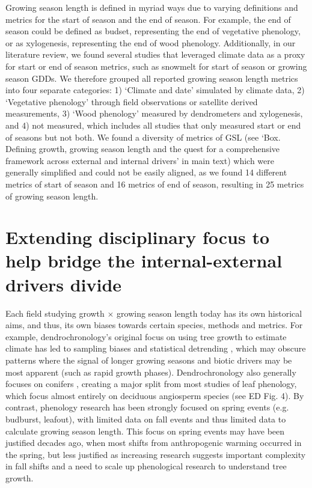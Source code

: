 \documentclass[11pt]{article}
\begin{document}
Growing season length is defined in myriad ways due to varying definitions and metrics for the start of season and the end of season. For example, the end of season could be defined as budset, representing the end of vegetative phenology, or as xylogenesis, representing the end of wood phenology. Additionally, in our literature review, we found several studies that leveraged climate data as a proxy for start or end of season metrics, such as snowmelt for start of season or growing season GDDs. We therefore grouped all reported growing season length metrics into four separate categories: 1) `Climate and date' simulated by climate data, 2) `Vegetative phenology' through field observations or satellite derived measurements, 3) `Wood phenology' measured by dendrometers and xylogenesis, and 4) not measured, which includes all studies that only measured start or end of seasons but not both. We found a diversity of metrics of GSL (see `Box. Defining growth, growing season length and the quest for a comprehensive framework across external and internal drivers' in main text) which were generally simplified and could not be easily aligned, as we found 14 different metrics of start of season and 16 metrics of end of season, resulting in  25 metrics of growing season length. 

\section*{Extending disciplinary focus to help bridge the internal-external drivers divide} 

Each field studying growth $\times$ growing season length today has its own historical aims, and thus, its own biases towards certain species, methods and metrics. For example, dendrochronology's original focus on using tree growth to estimate climate has led to sampling biases \citep[e.g. to `climate-sensitive' individual trees,][]{klesse2018sampling,nehrbass2014influence} and statistical detrending \citep{rollinson2021climate}, which may obscure patterns where the signal of longer growing seasons and biotic drivers may be most apparent (such as rapid growth phases). Dendrochronology also generally focuses on conifers \citep[gymnosperms,][]{zhao2019international}, creating a major split from most studies of leaf phenology, which focus almost entirely on deciduous angiosperm species (see ED Fig. 4). By contrast, phenology research has been strongly focused on spring events (e.g. budburst, leafout), with limited data on fall events and thus limited data to calculate growing season length. This focus on spring events may have been justified decades ago, when most shifts from anthropogenic warming occurred in the spring, but less justified as increasing research suggests important complexity in fall shifts \citep{gill2015,zohner2023effect} and a need to scale up phenological research to understand tree growth.
\end{document}
